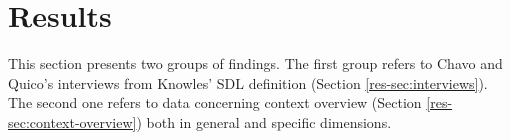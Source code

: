 \chapter{Results}
\label{chap:results}

This section presents two groups of findings. The first group refers to Chavo and Quico’s interviews from Knowles’ \acrfull{SDL} definition (Section \ref{res-sec:interviews}). The second one refers to data concerning context overview (Section \ref{res-sec:context-overview}) both in general and specific dimensions.
